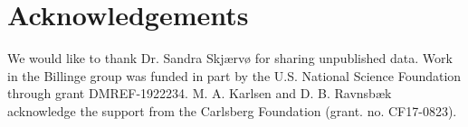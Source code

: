 \documentclass[preprint]{iucr}
\begin{document}
\section{Acknowledgements}

We would like to thank Dr. Sandra Skjærvø for sharing unpublished  data.
Work in the Billinge group was funded in part by the U.S. National Science Foundation through grant DMREF-1922234. M. A. Karlsen and D. B. Ravnsbæk acknowledge the support from the Carlsberg Foundation (grant. no. CF17-0823). 
%
\newpage
%






\setcounter{figure}{0}
\setcounter{equation}{0}
\setcounter{table}{0}
\makeatletter
\renewcommand{\fnum@figure}{Fig.~S\thefigure}
\renewcommand{\theequation}{S\arabic{equation}}
\renewcommand{\thetable}{S\arabic{table}}
\makeatother

\end{document}
